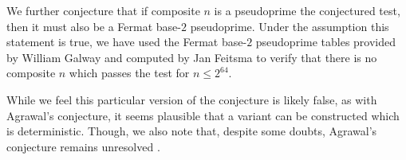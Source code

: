 \documentclass{article}
\theoremstyle{plain}
\theoremstyle{definition}
\begin{document}
We further conjecture that if composite $n$ is a pseudoprime the conjectured test, then it must also be a Fermat base-$2$ pseudoprime. Under the assumption this statement is true, we have used the Fermat base-$2$ pseudoprime tables provided by William Galway and computed by Jan Feitsma \cite{pseudoprimestables} to verify that there is no composite $n$ which passes the test for $n \leq 2^{64}$.

While we feel this particular version of the conjecture is likely false, as with Agrawal's conjecture, it seems plausible that a variant can be constructed which is deterministic. Though, we also note that, despite some doubts, Agrawal's conjecture remains unresolved \cite{lenstra2003agrawal, popovych2009agrawal}.

\begingroup
\raggedright


\endgroup
\end{document}
